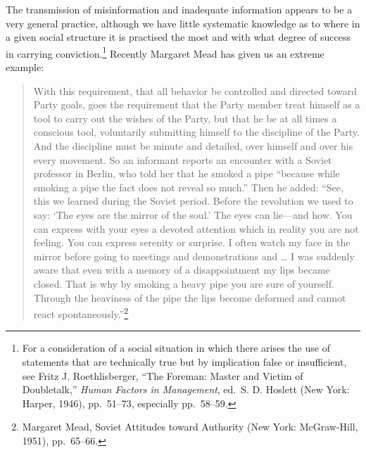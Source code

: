 \documentclass[openany,nobib]{tufte-book}
\begin{document}
The transmission of misinformation and inadequate in­formation appears to
be a very general practice, although we have little systematic knowledge
as to where in a given social structure it is practised the most and
with what degree of success in carrying conviction.\footnote{For a
  consideration of a social situation in which there arises the use of
  statements that are technically true but by im­plication false or
  insufficient, see Fritz J. Roethlisberger, ``The Foreman: Master and
  Victim of Doubletalk,'' \emph{Human Factors in Management}, ed.~S. D.
  Hoslett (New York: Harper, 1946), pp.~51--73, especially pp.~58--59.}
Recently Margaret Mead has given us an extreme example:

\begin{quote}
With this requirement, that all behavior be controlled and directed
toward Party goals, goes the requirement that the Party member treat
himself as a tool to carry out the wishes of the Party, but that he be
at all times a conscious tool, voluntarily submitting himself to the
discipline of the Party. And the discipline must be minute and detailed,
over himself and over his every movement. So an informant reports an
encounter with a Soviet professor in Berlin, who told her that he smoked
a pipe ``because while smoking a pipe the fact does not reveal so
much.'' Then he added: ``See, this we learned during the Soviet period.
Before the revolution we used to say: `The eyes are the mirror of the
soul.' The eyes can lie---and how. You can express with your eyes a
devoted attention which in reality you are not feeling. You can express
serenity or surprise. I often watch my face in the mirror before going
to meetings and demonstrations and \ldots{} I was suddenly aware that
even with a memory of a disappointment my lips became closed. That is
why by smoking a heavy pipe you are sure of yourself. Through the
heaviness of the pipe the lips become deformed and cannot react
spontaneously.''\footnote{Margaret Mead, Soviet Attitudes toward
  Authority (New York: McGraw-Hill, 1951), pp.~65--66.}
\end{quote}
\end{document}
